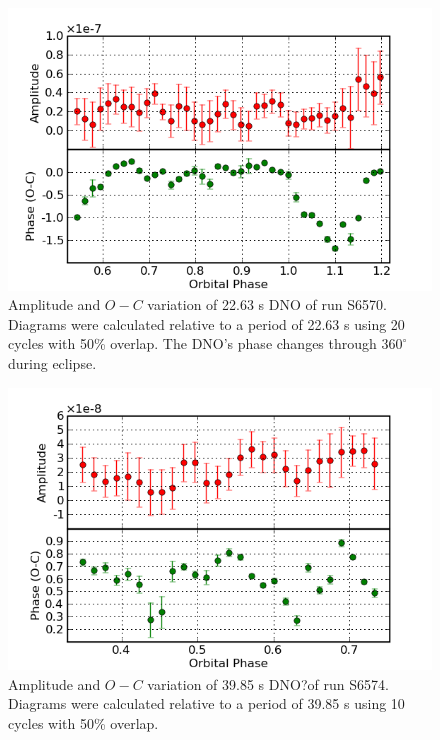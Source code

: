 \begin{figure}
 \centering
 \includegraphics[bb=0 0 600 400,width=0.85\columnwidth]{images/archive_phot/S6570/S6570_22.63.png}
 \caption[S6570 $O-C$ diagram of DNO]{Amplitude and $O-C$ variation of 22.63 s DNO of run S6570. Diagrams were calculated relative to a period of 22.63 s using 20 cycles with 50\% overlap. The DNO's phase changes through $360^{\circ}$ during eclipse. }
 \label{S6570_22.63}
\end{figure}

\begin{figure}
 \centering
 \includegraphics[bb=0 0 600 400,width=0.85\columnwidth]{images/archive_phot/S6574/S6574_39.85.png}
 \caption[S6574 $O-C$ diagram of 39.85 s DNO]{Amplitude and $O-C$ variation of 39.85 s DNO?of run S6574. Diagrams were calculated relative to a period of 39.85 s using 10 cycles with 50\% overlap. }
 \label{S6574_39.85}
\end{figure}

